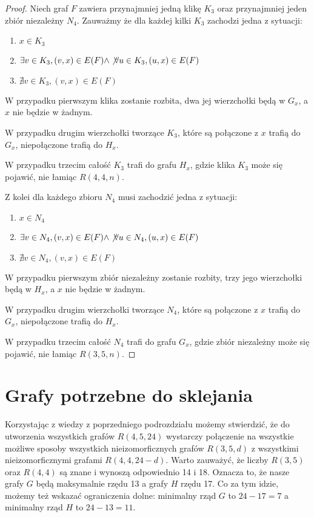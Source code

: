 \begin{proof}

  Niech graf $F$ zawiera przynajmniej jedną klikę $K_3$ oraz przynajmniej jeden zbiór niezależny $N_4$.
  Zauważmy że dla każdej kilki $K_3$ zachodzi jedna z sytuacji:
  \begin{enumerate}
    \item $x \in K_3$
    \item $ \exists v \in K_3, (v, x) \in E(F) \land \not \forall u \in K_3, (u,x) \in E(F)$ 
    \item $\nexists v \in K_3, (v, x) \in E(F)$
  \end{enumerate} 
  
  W przypadku pierwszym klika zostanie rozbita, dwa jej wierzchołki będą w $G_x$, a $x$ nie będzie w żadnym.
  
  W przypadku drugim wierzchołki tworzące $K_3$, które są połączone z $x$ trafią do $G_x$, niepołączone trafią do $H_x$.
  
  W przypadku trzecim całość $K_3$ trafi do grafu $H_x$, gdzie klika $K_3$ może się pojawić, nie łamiąc $R(4,4,n)$.

  Z kolei dla każdego zbioru $N_4$ musi zachodzić jedna z sytuacji:

  \begin{enumerate}
    \item $x \in N_4$
    \item $ \exists v \in N_4, (v, x) \in E(F) \land \not \forall u \in N_4, (u,x) \in E(F)$ 
    \item $\nexists v \in N_4, (v, x) \in E(F)$
  \end{enumerate} 

  W przypadku pierwszym zbiór niezależny zostanie rozbity, trzy jego wierzchołki będą w $H_x$, a $x$ nie będzie w żadnym.
  
  W przypadku drugim wierzchołki tworzące $N_4$, które są połączone z $x$ trafią do $G_x$, niepołączone trafią do $H_x$.
  
  W przypadku trzecim całość $N_4$ trafi do grafu $G_x$, gdzie zbiór niezależny może się pojawić, nie łamiąc $R(3,5,n)$.
  \end{proof}

\section{Grafy potrzebne do sklejania}

Korzystając z wiedzy z poprzedniego podrozdziału możemy stwierdzić, że do utworzenia wszystkich grafów $R(4,5,24)$ wystarczy połączenie na wszystkie możliwe sposoby
wszystkich nieizomorficznych grafów $R(3,5,d)$ z wszystkimi nieizomorficznymi grafami $R(4,4,24-d)$. 
Warto zauważyć, że liczby $R(3,5)$ oraz $R(4,4)$ są znane i wynoszą odpowiednio 14 i 18. Oznacza to, że nasze grafy $G$ będą maksymalnie rzędu 13 a grafy $H$ rzędu 17. Co za tym idzie, możemy też wskazać ograniczenia dolne:
minimalny rząd $G$ to $24-17=7$ a minimalny rząd $H$ to $24-13 = 11$.  


